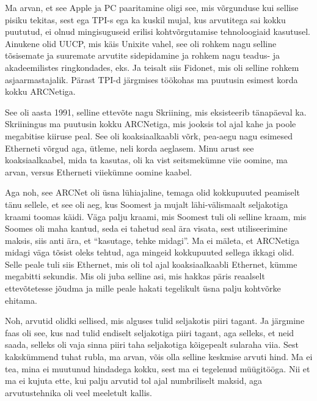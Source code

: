 Ma arvan, et see Apple ja PC paaritamine oligi see, mis  võrgunduse kui sellise pisiku tekitas, sest ega TPI-s ega ka kuskil mujal, kus arvutitega sai kokku puututud, ei olnud mingisuguseid erilisi kohtvõrgutamise tehnoloogiaid kasutusel. Ainukene olid UUCP, mis käis Unixite vahel, see oli rohkem nagu selline tõsisemate ja suuremate arvutite sidepidamine  ja rohkem nagu teadus- ja akadeemilistes ringkondades, eks. Ja teisalt siis Fidonet, mis oli selline rohkem asjaarmastajalik. Pärast TPI-d järgmises töökohas ma  puutusin esimest korda kokku ARCNetiga.


See oli  aasta 1991, selline ettevõte nagu Skriining, mis eksisteerib tänapäeval ka. Skriiningus ma puutusin kokku ARCNetiga, mis jooksis tol ajal kahe ja poole megabitise kiiruse peal. See oli koaksiaalkaabli võrk, pea-aegu nagu esimesed Etherneti võrgud aga, ütleme, neli korda aeglasem. Minu arust see koaksiaalkaabel, mida ta kasutas, oli ka vist seitsmekümne viie oomine, ma arvan, versus Etherneti viiekümne oomine kaabel. 

Aga noh, see ARCNet oli  üsna lühiajaline, temaga olid kokkupuuted peamiselt  tänu sellele, et see oli  aeg, kus Soomest ja mujalt lähi-välismaalt seljakotiga kraami toomas käidi. Väga palju kraami, mis Soomest tuli oli selline kraam, mis Soomes oli maha kantud, seda ei tahetud seal ära visata, sest  utiliseerimine maksis, siis anti ära, et \enquote{kasutage, tehke midagi}. Ma ei mäleta, et ARCNetiga midagi väga tõsist oleks tehtud, aga mingeid kokkupuuted sellega ikkagi olid. Selle peale tuli siis Ethernet, mis oli tol ajal koaksiaalkaabli Ethernet, kümme megabitti sekundis. Mis oli juba selline asi, mis hakkas päris reaalselt ettevõtetesse jõudma ja mille peale hakati tegelikult üsna palju  kohtvõrke ehitama.


Noh, arvutid olidki sellised, mis alguses tulid seljakotis piiri tagant. Ja järgmine faas oli see, kus  nad tulid endiselt seljakotiga piiri tagant, aga selleks, et neid saada, selleks oli vaja sinna piiri taha seljakotiga kõigepealt sularaha viia. Sest kakskümmend tuhat rubla, ma arvan, võis olla  selline keskmise arvuti hind. Ma ei tea, mina ei muutunud hindadega kokku, sest ma ei tegelenud müügitööga. Nii et ma ei kujuta ette, kui palju  arvutid tol ajal  numbriliselt maksid, aga arvutustehnika oli veel meeletult kallis.

